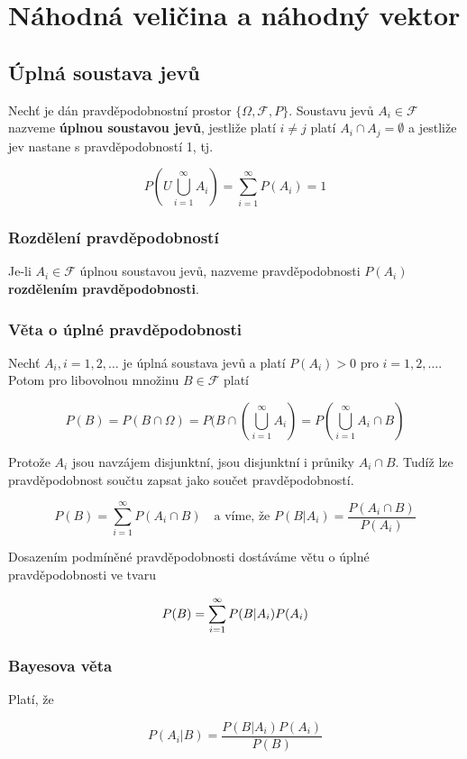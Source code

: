\chapter{Náhodná veličina a náhodný vektor}
\section{Úplná soustava jevů}
Nechť je dán pravděpodobnostní prostor $\{\Omega,\mathscr{F},P\}$. Soustavu jevů $A_i\in\mathscr{F}$ nazveme \textbf{úplnou soustavou jevů}, jestliže platí $i\neq j$ platí $A_i\cap A_j=\emptyset$ a jestliže jev  nastane s pravděpodobností 1, tj.

\[ P\left(U\bigcup_{i=1}^\infty A_i\right)=\sum_{i=1}^\infty P(A_i)=1 \]

\subsection{Rozdělení pravděpodobností}
Je-li $A_i\in\mathscr{F}$ úplnou soustavou jevů, nazveme pravděpodobnosti $P(A_i)$ \textbf{rozdělením pravděpodobnosti}.

\subsection{Věta o úplné pravděpodobnosti}
Nechť $A_i,i=1,2,\ldots$ je úplná soustava jevů a platí $P(A_i)>0$ pro $i=1,2,\ldots$. Potom pro libovolnou množinu $B\in\mathscr{F}$ platí

\[ P(B)=P(B\cap \Omega)=P(B\cap \left(\bigcup_{i=1}^\infty A_i\right)=P\left( \bigcup_{i=1}^\infty A_i\cap B\right) \]

Protože $A_i$ jsou navzájem disjunktní, jsou disjunktní i průniky $A_i\cap B$. Tudíž lze pravděpodobnost součtu zapsat jako součet pravděpodobností.

\[ P(B) = \sum_{i=1}^\infty P(A_i\cap B)\quad \text{a víme, že } P(B|A_i)=\frac{P(A_i\cap B)}{P(A_i)} \]

Dosazením podmíněné pravděpodobnosti dostáváme větu o úplné pravděpodobnosti ve tvaru

\[ P(B)=\sum_{i=1}^\infty P(B|A_i)P(A_i) \]

\subsection{Bayesova věta}
Platí, že

\[ P(A_i|B)=\frac{P(B|A_i)P(A_i)}{P(B)} \]

